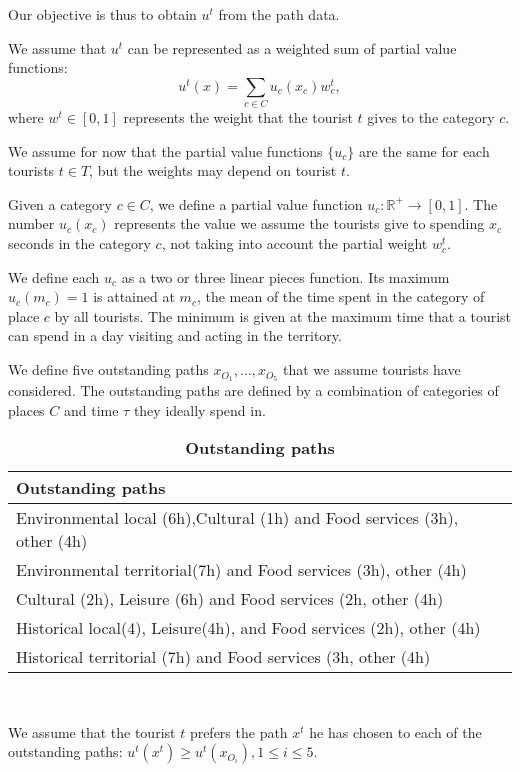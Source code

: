 \documentclass[a4paper]{article}
\begin{document}
Our objective is thus to obtain $u^t$ from the path data.

We assume that $u^t$ can be represented as a weighted sum  of partial value functions:
\begin{equation}
u^t(x) = \sum_{c \in C} u_c(x_c) w^t_c,
\end{equation}
where $w^t \in [0,1]$ represents the weight that the tourist $t$ gives to the category $c$.

We assume for now that the partial value functions $\{u_c\}$ are the same for each tourists $t \in T$, but the weights may depend on tourist $t$.

Given a category $c \in C$, we define a partial value function $u_c:{\mathbb{R}^+} \rightarrow [0,1]$. The number $u_c(x_c)$ represents the value we assume the tourists give to spending $x_c$ seconds in the category $c$, not taking into account the partial weight $w^t_c$.

We define each $u_c$ as a two or three linear pieces function. Its maximum $u_c(m_c)=1$ is attained at $m_c$, the mean of the time spent in the category of place $c$ by all tourists. The minimum is given at the maximum time that a tourist can spend in a day visiting and acting in the territory.

We define five outstanding paths $x_{O_1}, \ldots, x_{O_5}$ that we assume tourists have considered. The outstanding paths are defined by a combination of categories of places $C$ and time $\tau$ they ideally spend in.
\begin{table}[h]
\centering
\begin{tabular}{ll}
\hline
\textbf{Outstanding paths}\\
\hline
\parbox{11cm}{Environmental local (6h),Cultural (1h) and Food services (3h), other (4h)}\\
\parbox{11cm}{Environmental territorial(7h) and Food services (3h), other (4h)}\\
\parbox{11cm}{Cultural (2h), Leisure (6h) and Food services (2h, other (4h)}\\
\parbox{11cm}{Historical local(4), Leisure(4h), and Food services (2h), other (4h)}\\
\parbox{11cm}{Historical territorial (7h) and Food services (3h, other (4h)}\\
\hline
\end{tabular}
\caption{\textbf{Outstanding paths}}\
\label{Table}
\end{table}


We assume that the tourist $t$ prefers the path $x^t$ he has chosen to each of the outstanding paths: $u^t(x^t) \geq u^t(x_{O_i}), 1 \leq  i \leq 5$.
\end{document}
